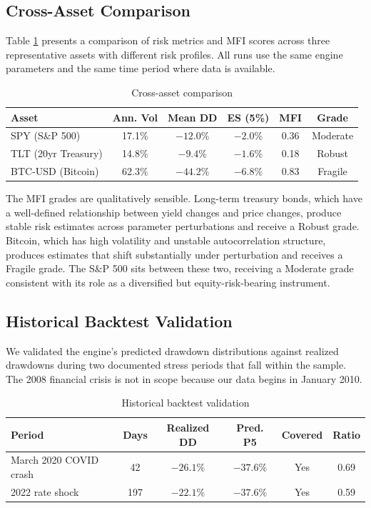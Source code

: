 \documentclass[12pt]{article}
\begin{document}
\subsection{Cross-Asset Comparison}

Table \ref{tab:cross_asset} presents a comparison of risk metrics and MFI scores
across three representative assets with different risk profiles. All runs use the
same engine parameters and the same time period where data is available.

\begin{table}[h]
\centering
\caption{Cross-asset comparison}
\label{tab:cross_asset}
\begin{tabular}{lccccc}
\toprule
Asset & Ann. Vol & Mean DD & ES (5\%) & MFI & Grade \\
\midrule
SPY (S\&P 500)       & 17.1\% & $-12.0\%$ & $-2.0\%$ & 0.36 & Moderate \\
TLT (20yr Treasury)  & 14.8\% & $-9.4\%$  & $-1.6\%$ & 0.18 & Robust   \\
BTC-USD (Bitcoin)    & 62.3\% & $-44.2\%$ & $-6.8\%$ & 0.83 & Fragile  \\
\bottomrule
\end{tabular}
\end{table}

The MFI grades are qualitatively sensible. Long-term treasury bonds, which have a
well-defined relationship between yield changes and price changes, produce stable
risk estimates across parameter perturbations and receive a Robust grade. Bitcoin,
which has high volatility and unstable autocorrelation structure, produces estimates
that shift substantially under perturbation and receives a Fragile grade. The S\&P 500
sits between these two, receiving a Moderate grade consistent with its role as a
diversified but equity-risk-bearing instrument.

\subsection{Historical Backtest Validation}

We validated the engine's predicted drawdown distributions against realized drawdowns
during two documented stress periods that fall within the sample. The 2008 financial
crisis is not in scope because our data begins in January 2010.

\begin{table}[h]
\centering
\caption{Historical backtest validation}
\label{tab:backtest}
\begin{tabular}{lccccc}
\toprule
Period & Days & Realized DD & Pred. P5 & Covered & Ratio \\
\midrule
March 2020 COVID crash & 42  & $-26.1\%$ & $-37.6\%$ & Yes & 0.69 \\
2022 rate shock        & 197 & $-22.1\%$ & $-37.6\%$ & Yes & 0.59 \\
\bottomrule
\end{tabular}
\end{table}
\end{document}
